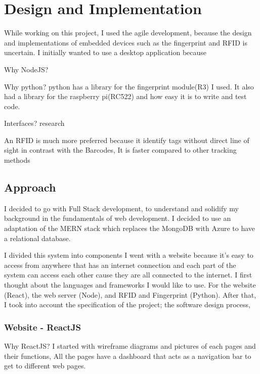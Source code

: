 \chapter{Design and Implementation}
While working on this project, I used the agile development, because the design and implementations of embedded devices such as the fingerprint and RFID is uncertain. I initially wanted to use a desktop application because 

Why NodeJS?

Why python?
python has a library for the fingerprint module(R3) I used. It also had a library for the raspberry pi(RC522) and how easy it is to write and test code.

Interfaces?
 research

An RFID is much more preferred because it identify tags without direct line of sight in contrast with the Barcodes, It is faster compared to other tracking methods 

\section{Approach}

I decided to go with Full Stack development, to understand and solidify my background in the fundamentals of web development. I decided to use an adaptation of the MERN stack which replaces the MongoDB with Azure to have a relational database.

I divided this system into components 
I went with a website because it's easy to access from anywhere that has an internet connection and each part of the system can access each other cause they are all connected to the internet. I first thought about the languages and frameworks I would like to use. For the website (React), the web server (Node), and RFID and Fingerprint (Python). After that, I took into account the specification of the project; the software design process,

\subsection{Website - ReactJS}
Why ReactJS?
I started with wireframe diagrams and pictures of each pages and their functions, All the pages have a dashboard that acts as a navigation bar to get to different web pages. 

